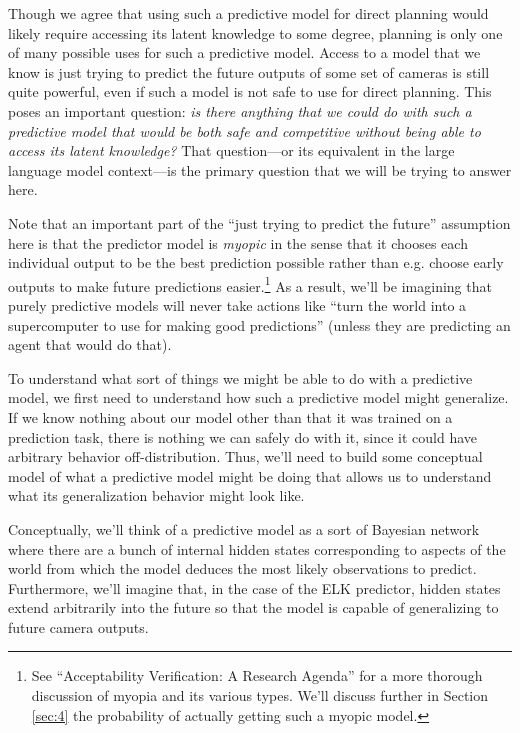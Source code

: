\documentclass[
  twocolumn,
  natbib,
]{miri-tech-article}
\begin{document}
Though we agree that using such a predictive model for direct planning would likely require accessing its latent knowledge to some degree, planning is only one of many possible uses for such a predictive model. Access to a model that we know is just trying to predict the future outputs of some set of cameras is still quite powerful, even if such a model is not safe to use for direct planning. This poses an important question: \textit{is there anything that we could do with such a predictive model that would be both safe and competitive without being able to access its latent knowledge?} That question---or its equivalent in the large language model context---is the primary question that we will be trying to answer here.

Note that an important part of the ``just trying to predict the future'' assumption here is that the predictor model is \textit{myopic} in the sense that it chooses each individual output to be the best prediction possible rather than e.g. choose early outputs to make future predictions easier.\footnote{See ``Acceptability Verification: A Research Agenda''\cite{acceptability_verification} for a more thorough discussion of myopia and its various types. We'll discuss further in Section \ref{sec:4} the probability of actually getting such a myopic model.} As a result, we'll be imagining that purely predictive models will never take actions like ``turn the world into a supercomputer to use for making good predictions'' (unless they are predicting an agent that would do that).

To understand what sort of things we might be able to do with a predictive model, we first need to understand how such a predictive model might generalize. If we know nothing about our model other than that it was trained on a prediction task, there is nothing we can safely do with it, since it could have arbitrary behavior off-distribution. Thus, we'll need to build some conceptual model of what a predictive model might be doing that allows us to understand what its generalization behavior might look like.

Conceptually, we'll think of a predictive model as a sort of Bayesian network where there are a bunch of internal hidden states corresponding to aspects of the world from which the model deduces the most likely observations to predict. Furthermore, we'll imagine that, in the case of the ELK predictor, hidden states extend arbitrarily into the future so that the model is capable of generalizing to future camera outputs.
\end{document}
